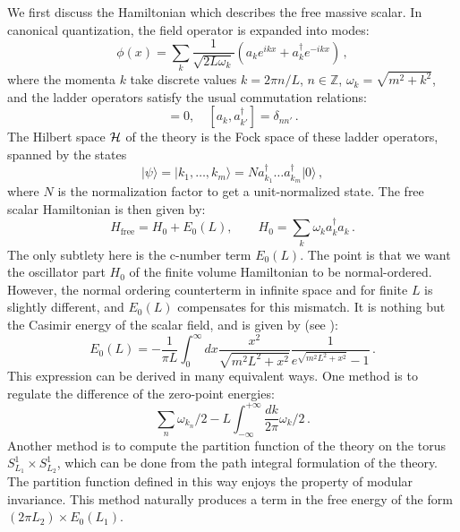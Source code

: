\documentclass[11pt]{article}
\newcommand{\beq}{\begin{equation}}
\newcommand{\eeq}{\end{equation}}
\def\calH {{\cal H}}
\newcommand{\ket}[1]{|#1\rangle}
\numberwithin{equation}{section}
\begin{document}
We first discuss the Hamiltonian which describes the free massive scalar. In canonical quantization, the field operator is expanded into modes:
\begin{equation}
\label{eq:modeexp}
\phi(x) = \sum_{k} \frac{1}{\sqrt{2L  \omega_k}} \left( a_k e^{i k x} + a_k^\dagger e^{-i k x}\right)\,,
\end{equation}
where the momenta $k$ take discrete values $k = {2 \pi n}/{L}$, $n\in \mathbb{Z}$, $\omega_k = \sqrt{m^2 + k^2}$, and the ladder operators satisfy the usual commutation relations:
\begin{equation}
 [a_k , a_{k'}] = 0, \quad [a_k , a^\dagger_{k'}] = \delta_{n n'}\,.
\end{equation}
The Hilbert space $\calH$ of the theory is the Fock space of these ladder operators, spanned by the states  
\beq
\ket{\psi}=\ket{k_1,\ldots,k_m}=N a^\dagger_{k_1} \dots a^\dagger_{k_m} | 0 \rangle\,,
\label{eq:state}
\eeq
where $N$ is the normalization factor to get a unit-normalized state. 
The free scalar Hamiltonian is then given by:
\beq
H_{\text{free}} = H_0 + E_0(L),\qquad H_0=\sum_k \omega_k a^\dagger_k  a_k \,.
\label{eq:H0}
\eeq
The only subtlety here is the c-number term $E_0(L)$. The point is that we want the oscillator part $H_0$ of the finite volume Hamiltonian to be normal-ordered. However, the normal ordering counterterm in infinite space and for finite $L$ is slightly different, and $E_0(L)$ compensates for this mismatch. It is nothing but the Casimir energy of the scalar field, and is given by (see \cite{Bordag:2009zzd}):
\beq
\label{eq:E0L}
E_0(L)=-\frac{1}{\pi L}\int_0^\infty dx \frac{x^2}{\sqrt{m^2L^2+x^2}} \frac{1}{e^{\sqrt{m^2L^2+x^2}}-1}\, .
\eeq
This expression can be derived in many equivalent ways. One method is to regulate the difference of the zero-point energies:
\beq
\sum_n  \omega_{k_n}/2 - L \int_{-\infty}^{+\infty} \frac{dk}{2\pi} \omega_k/2 \, .
\eeq
Another method is to compute the partition function of the theory on the torus $S_{L_1}^1\times S_{L_2}^1$, which can be done from the path integral formulation of the theory. The partition function defined in this way enjoys the property of modular invariance. This method naturally produces a term in the free energy of the form $(2\pi L_2)\times E_0(L_1)$.%
\end{document}
